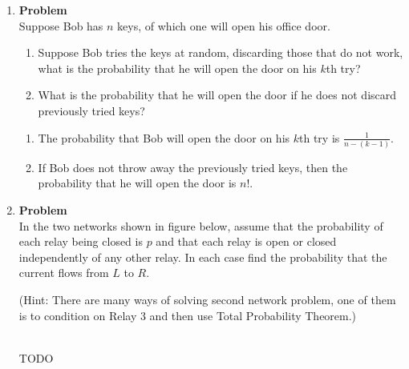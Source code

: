 \documentclass[12pt]{article}
\newenvironment{Ex}{\textbf{Problem}\vspace{.75em}\\}{}
\begin{document}
\begin{enumerate}
\begin{Ex}
\begin{solution}
      \end{solution}
    \end{Ex}
  \item
    \begin{Ex}
      Suppose Bob has $n$ keys, of which one will open his office
      door.
      \begin{enumerate}
      \item Suppose Bob tries the keys at random, discarding those
        that do not work, what is the probability that he will open
        the door on his $k$th try?
      \item What is the probability that he will open the door if he
        does not discard previously tried keys?
      \end{enumerate}
      \begin{solution} \hfill
        \begin{enumerate}
        \item The probability that Bob will open the door on his $k$th
          try is $\frac{1}{n-(k-1)}$.
        \item If Bob does not throw away the previously tried keys,
          then the probability that he will open the door is $n!$.
        \end{enumerate}
      \end{solution}
    \end{Ex}
  \item
    \begin{Ex}
      In the two networks shown in figure below, assume that the
      probability of each relay being closed is $p$ and that each
      relay is open or closed independently of any other relay. In
      each case find the probability that the current flows from $L$
      to $R$.

      (Hint: There are many ways of solving second network problem,
      one of them is to condition on Relay 3 and then use Total
      Probability Theorem.)
      \begin{solution} \hfill \\
        {\huge TODO}
      \end{solution}
    \end{Ex}
\end{enumerate}
\end{document}
